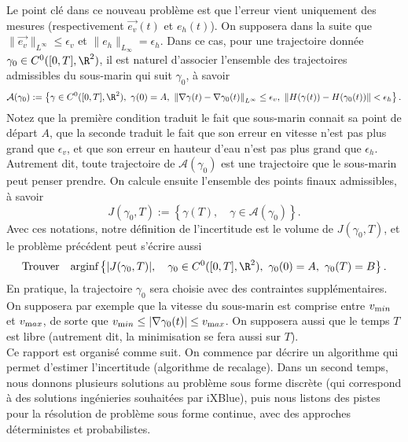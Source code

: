 Le point clé dans ce nouveau problème est que l'erreur vient uniquement des mesures (respectivement $\vec{e_v}(t)$ et $e_h(t)$). On supposera dans la suite que $\| \vec{e_v} \|_{L^\infty} \le \epsilon_v$ et $\| e_h \|_{L_\infty} = \epsilon_h$. Dans ce cas, pour une trajectoire donnée $\gamma_0 \in C^0([0,T], \R^2)$, il est naturel d'associer l'ensemble des trajectoires admissibles du sous-marin qui suit $\gamma_0$, à savoir
\[
	\mathcal{A}(\gamma_0) := \left\{ \gamma \in C^0([0,T],\R^2), \ \gamma(0) = A, \ \left\| \nabla \gamma (t) - \nabla \gamma_0(t) \right\|_{L^\infty} \le \epsilon_v, \ \left\| H(\gamma(t)) -  H(\gamma_0(t)) \right\| < \epsilon_h \right\}.
\]
Notez que la première condition traduit le fait que sous-marin connait sa point de départ $A$, que la seconde traduit le fait que son erreur en vitesse n'est pas plus grand que $\epsilon_v$, et que son erreur en hauteur d'eau n'est pas plus grand que $\epsilon_h$. Autrement dit, toute trajectoire de $\mathcal{A}(\gamma_0)$ est une trajectoire que le sous-marin peut penser prendre. On calcule ensuite l'ensemble des points finaux admissibles, à savoir
\[
	J(\gamma_0, T) := \left\{ \gamma(T), \quad \gamma \in \mathcal{A}(\gamma_0) \right\}.
\]
Avec ces notations, notre définition de l'incertitude est le volume de $J(\gamma_0, T)$, et le problème précédent peut s'écrire aussi
\[
	\textrm{Trouver} \quad \textrm{arginf} \left\{ | J(\gamma_0, T) |, \quad \gamma_0 \in C^0([0,T], \R^2), \ \gamma_0(0) = A, \ \gamma_0(T) = B \right\}.
\]
En pratique, la trajectoire $\gamma_0$ sera choisie avec des contraintes supplémentaires. On supposera par exemple que la vitesse du sous-marin est comprise entre $v_{\textrm min}$ et $v_{\textrm max}$, de sorte que $v_{\textrm min} \le | \nabla \gamma_0(t) | \le v_{\textrm max}$.  On supposera aussi que le temps $T$ est libre (autrement dit, la minimisation se fera aussi sur $T$). \\







Ce rapport est organisé comme suit. On commence par décrire un algorithme qui permet d'estimer l'incertitude (algorithme de recalage). Dans un second temps, nous donnons plusieurs solutions au problème sous forme discrète (qui correspond à des solutions ingénieries souhaitées par iXBlue), puis nous listons des pistes pour la résolution de problème sous forme continue, avec des approches déterministes et probabilistes.

















